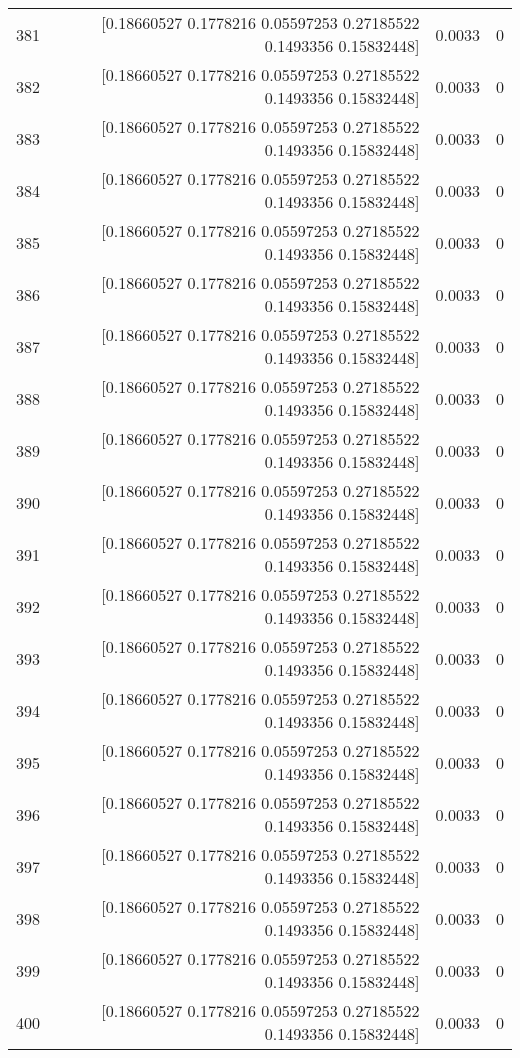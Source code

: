 \begin{longtable}{lrrr}
381 & [0.18660527 0.1778216  0.05597253 0.27185522 0.1493356  0.15832448] & 0.0033 & 0 \\
382 & [0.18660527 0.1778216  0.05597253 0.27185522 0.1493356  0.15832448] & 0.0033 & 0 \\
383 & [0.18660527 0.1778216  0.05597253 0.27185522 0.1493356  0.15832448] & 0.0033 & 0 \\
384 & [0.18660527 0.1778216  0.05597253 0.27185522 0.1493356  0.15832448] & 0.0033 & 0 \\
385 & [0.18660527 0.1778216  0.05597253 0.27185522 0.1493356  0.15832448] & 0.0033 & 0 \\
386 & [0.18660527 0.1778216  0.05597253 0.27185522 0.1493356  0.15832448] & 0.0033 & 0 \\
387 & [0.18660527 0.1778216  0.05597253 0.27185522 0.1493356  0.15832448] & 0.0033 & 0 \\
388 & [0.18660527 0.1778216  0.05597253 0.27185522 0.1493356  0.15832448] & 0.0033 & 0 \\
389 & [0.18660527 0.1778216  0.05597253 0.27185522 0.1493356  0.15832448] & 0.0033 & 0 \\
390 & [0.18660527 0.1778216  0.05597253 0.27185522 0.1493356  0.15832448] & 0.0033 & 0 \\
391 & [0.18660527 0.1778216  0.05597253 0.27185522 0.1493356  0.15832448] & 0.0033 & 0 \\
392 & [0.18660527 0.1778216  0.05597253 0.27185522 0.1493356  0.15832448] & 0.0033 & 0 \\
393 & [0.18660527 0.1778216  0.05597253 0.27185522 0.1493356  0.15832448] & 0.0033 & 0 \\
394 & [0.18660527 0.1778216  0.05597253 0.27185522 0.1493356  0.15832448] & 0.0033 & 0 \\
395 & [0.18660527 0.1778216  0.05597253 0.27185522 0.1493356  0.15832448] & 0.0033 & 0 \\
396 & [0.18660527 0.1778216  0.05597253 0.27185522 0.1493356  0.15832448] & 0.0033 & 0 \\
397 & [0.18660527 0.1778216  0.05597253 0.27185522 0.1493356  0.15832448] & 0.0033 & 0 \\
398 & [0.18660527 0.1778216  0.05597253 0.27185522 0.1493356  0.15832448] & 0.0033 & 0 \\
399 & [0.18660527 0.1778216  0.05597253 0.27185522 0.1493356  0.15832448] & 0.0033 & 0 \\
400 & [0.18660527 0.1778216  0.05597253 0.27185522 0.1493356  0.15832448] & 0.0033 & 0 \\

\end{longtable}

